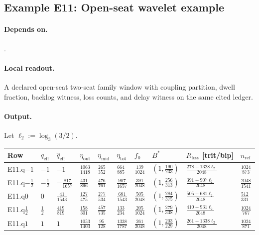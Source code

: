 \subsection{Example E11: Open-seat wavelet example}\label{ex:e11}
\paragraph{Depends on.} .
\paragraph{Local readout.} A declared open-seat two-seat family window with coupling partition, dwell fraction, backlog witness, loss counts, and delay witness on the same cited ledger.
\paragraph{Output.} Let $\ell_2:=\log_3(3/2)$.
{\scriptsize
\begin{center}
\begin{tabular}{@{}llllllllll@{}}
\toprule
Row & $q_{\mathrm{eff}}$ & $\widehat q_{\mathrm{eff}}$ & $\eta_{\mathrm{out}}$ & $\eta_{\mathrm{mid}}$ & $\eta_{\mathrm{tot}}$ & $f_0$ & $B^*$ & $R_{\mathrm{loss}}$ [trit/bip] & $n_{\mathrm{ref}}$ \\
\midrule
E11.q$-1$ & $-1$ & $-1$ & $\frac{1063}{1418}$ & $\frac{265}{352}$ & $\frac{664}{885}$ & $\frac{139}{1024}$ & $(1,\frac{190}{233})$ & $\frac{278+1328\ell_2}{2048}$ & $\frac{1024}{873}$ \\
E11.q$-\frac12$ & $-\frac12$ & $-\frac{817}{1657}$ & $\frac{431}{896}$ & $\frac{476}{761}$ & $\frac{907}{1657}$ & $\frac{391}{2048}$ & $(1,\frac{256}{313})$ & $\frac{391+907\ell_2}{2048}$ & $\frac{2048}{1541}$ \\
E11.q$0$ & $0$ & $\frac{41}{1543}$ & $\frac{127}{475}$ & $\frac{277}{534}$ & $\frac{681}{1543}$ & $\frac{505}{2048}$ & $(1,\frac{284}{375})$ & $\frac{505+681\ell_2}{2048}$ & $\frac{512}{331}$ \\
E11.q$\frac12$ & $\frac12$ & $\frac{419}{819}$ & $\frac{158}{301}$ & $\frac{457}{735}$ & $\frac{133}{234}$ & $\frac{205}{1024}$ & $(1,\frac{279}{338})$ & $\frac{410+931\ell_2}{2048}$ & $\frac{1024}{767}$ \\
E11.q$1$ & $1$ & $1$ & $\frac{1053}{1403}$ & $\frac{95}{128}$ & $\frac{1338}{1787}$ & $\frac{261}{2048}$ & $(1,\frac{203}{229})$ & $\frac{261+1338\ell_2}{2048}$ & $\frac{1024}{871}$ \\
\bottomrule
\end{tabular}
\end{center}}
